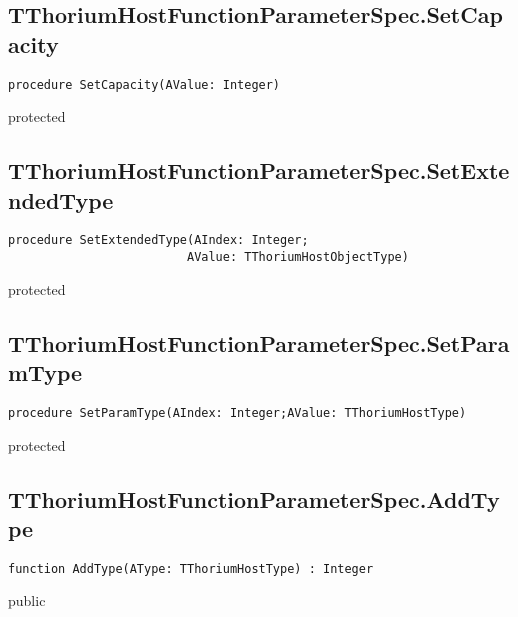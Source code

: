 \subsection{TThoriumHostFunctionParameterSpec.SetCapacity}
\label{thoriumcore:thorium:tthoriumhostfunctionparameterspec:setcapacity}
\begin{FPCList}
\Synopsis
\Declaration 

\begin{verbatim}
procedure SetCapacity(AValue: Integer)
\end{verbatim}
\Visibility
protected
\Description
\Errors
\end{FPCList}
\subsection{TThoriumHostFunctionParameterSpec.SetExtendedType}
\label{thoriumcore:thorium:tthoriumhostfunctionparameterspec:setextendedtype}
\begin{FPCList}
\Synopsis
\Declaration 

\begin{verbatim}
procedure SetExtendedType(AIndex: Integer;
                         AValue: TThoriumHostObjectType)
\end{verbatim}
\Visibility
protected
\Description
\Errors
\end{FPCList}
\subsection{TThoriumHostFunctionParameterSpec.SetParamType}
\label{thoriumcore:thorium:tthoriumhostfunctionparameterspec:setparamtype}
\begin{FPCList}
\Synopsis
\Declaration 

\begin{verbatim}
procedure SetParamType(AIndex: Integer;AValue: TThoriumHostType)
\end{verbatim}
\Visibility
protected
\Description
\Errors
\end{FPCList}
\subsection{TThoriumHostFunctionParameterSpec.AddType}
\label{thoriumcore:thorium:tthoriumhostfunctionparameterspec:addtype}
\begin{FPCList}
\Synopsis
\Declaration 

\begin{verbatim}
function AddType(AType: TThoriumHostType) : Integer
\end{verbatim}
\Visibility
public
\Description
\Errors
\end{FPCList}
